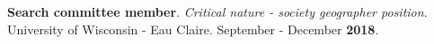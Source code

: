 \begin{cventries}
  \cventry
    {}
    {}
    {}
    {}
    {
       \begin{cvitems}
          \vspace{-3mm}
        \item {\textbf{Search committee member}. \textit{Critical nature -
              society geographer position}. University of Wisconsin - Eau
            Claire. September - December \textbf{2018}.}
          \end{cvitems}
          }

\end{cventries}